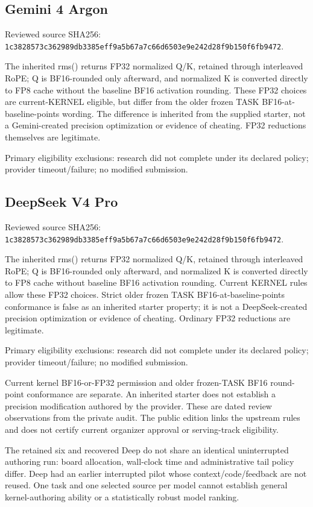 \documentclass[11pt,letterpaper]{article}
\newcommand{\hash}[1]{{\footnotesize\nolinkurl{#1}}}
\begin{document}
\subsection*{Gemini 4 Argon}

Reviewed source SHA256: \hash{1c3828573c362989db3385eff9a5b67a7c66d6503e9e242d28f9b150f6fb9472}.


The inherited rms() returns FP32 normalized Q/K, retained through interleaved RoPE; Q is BF16-rounded only afterward, and normalized K is converted directly to FP8 cache without the baseline BF16 activation rounding. These FP32 choices are current-KERNEL eligible, but differ from the older frozen TASK BF16-at-baseline-points wording. The difference is inherited from the supplied starter, not a Gemini-created precision optimization or evidence of cheating. FP32 reductions themselves are legitimate.

Primary eligibility exclusions: research did not complete under its declared policy; provider timeout/failure; no modified submission.

\subsection*{DeepSeek V4 Pro}

Reviewed source SHA256: \hash{1c3828573c362989db3385eff9a5b67a7c66d6503e9e242d28f9b150f6fb9472}.


The inherited rms() returns FP32 normalized Q/K, retained through interleaved RoPE; Q is BF16-rounded only afterward, and normalized K is converted directly to FP8 cache without baseline BF16 activation rounding. Current KERNEL rules allow these FP32 choices. Strict older frozen TASK BF16-at-baseline-points conformance is false as an inherited starter property; it is not a DeepSeek-created precision optimization or evidence of cheating. Ordinary FP32 reductions are legitimate.

Primary eligibility exclusions: research did not complete under its declared policy; provider timeout/failure; no modified submission.

Current kernel BF16-or-FP32 permission and older frozen-TASK BF16 round-point conformance are separate. An inherited starter does not establish a precision modification authored by the provider. These are dated review observations from the private audit. The public edition links the upstream rules and does not certify current organizer approval or serving-track eligibility.

The retained six and recovered Deep do not share an identical uninterrupted authoring run: board allocation, wall-clock time and administrative tail policy differ. Deep had an earlier interrupted pilot whose context/code/feedback are not reused. One task and one selected source per model cannot establish general kernel-authoring ability or a statistically robust model ranking.
\end{document}
